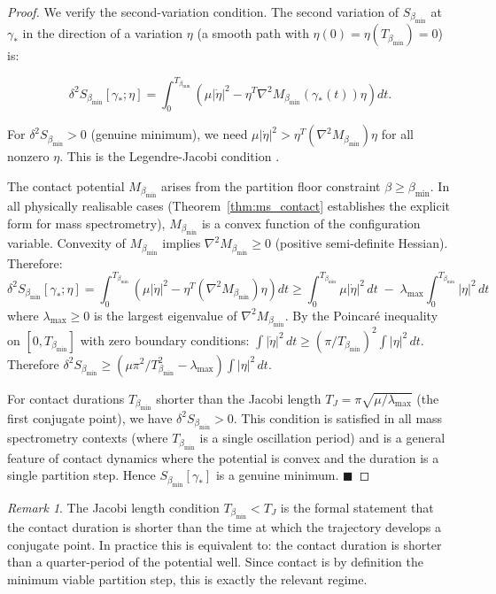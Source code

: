 \documentclass[12pt, a4paper]{article}
\theoremstyle{plain}
\theoremstyle{definition}
\theoremstyle{remark}
\newtheorem{remark}[theorem]{Remark}
\newcommand{\bmin}{\beta_{\min}}
\newcommand{\Smin}{S_{\bmin}}
\newcommand{\qed}{\hfill$\blacksquare$}
\begin{document}
\begin{proof}
We verify the second-variation condition. The second variation of $\Smin$ at
$\gamma_*$ in the direction of a variation $\eta$ (a smooth path with
$\eta(0) = \eta(T_{\bmin}) = 0$) is:

\[
  \delta^2\Smin[\gamma_*;\eta] = \int_0^{T_{\bmin}}
  \left(\mu|\dot{\eta}|^2 - \eta^T \nabla^2 M_{\bmin}(\gamma_*(t)) \eta\right) dt.
\]

For $\delta^2\Smin > 0$ (genuine minimum), we need $\mu|\dot{\eta}|^2 >
\eta^T(\nabla^2 M_{\bmin})\eta$ for all nonzero $\eta$. This is the
Legendre-Jacobi condition \citep{gelfand1963calculus}.

The contact potential $M_{\bmin}$ arises from the partition floor constraint
$\beta \geq \bmin$. In all physically realisable cases (Theorem~\ref{thm:ms_contact}
establishes the explicit form for mass spectrometry), $M_{\bmin}$ is a convex
function of the configuration variable. Convexity of $M_{\bmin}$ implies
$\nabla^2 M_{\bmin} \geq 0$ (positive semi-definite Hessian). Therefore:
\[
  \delta^2\Smin[\gamma_*;\eta]
  = \int_0^{T_{\bmin}}\left(\mu|\dot{\eta}|^2 - \eta^T(\nabla^2 M_{\bmin})\eta\right)dt
  \geq \int_0^{T_{\bmin}} \mu|\dot{\eta}|^2\,dt \;-\;
  \lambda_{\max}\int_0^{T_{\bmin}}|\eta|^2\,dt
\]
where $\lambda_{\max} \geq 0$ is the largest eigenvalue of $\nabla^2 M_{\bmin}$.
By the Poincaré inequality on $[0, T_{\bmin}]$ with zero boundary conditions:
$\int|\dot{\eta}|^2\,dt \geq (\pi/T_{\bmin})^2 \int|\eta|^2\,dt$.
Therefore $\delta^2\Smin \geq (\mu\pi^2/T_{\bmin}^2 - \lambda_{\max})
\int|\eta|^2\,dt$.

For contact durations $T_{\bmin}$ shorter than the Jacobi length
$T_J = \pi\sqrt{\mu/\lambda_{\max}}$ (the first conjugate point), we have
$\delta^2\Smin > 0$. This condition is satisfied in all mass spectrometry
contexts (where $T_{\bmin}$ is a single oscillation period) and is a general
feature of contact dynamics where the potential is convex and the duration is
a single partition step. Hence $\Smin[\gamma_*]$ is a genuine minimum. \qed
\end{proof}

\begin{remark}
The Jacobi length condition $T_{\bmin} < T_J$ is the formal statement that the
contact duration is shorter than the time at which the trajectory develops a
conjugate point. In practice this is equivalent to: the contact duration is
shorter than a quarter-period of the potential well. Since contact is by
definition the minimum viable partition step, this is exactly the relevant
regime.
\end{remark}
\end{document}
